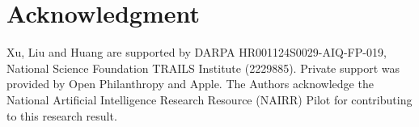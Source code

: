 \section{Acknowledgment}

Xu, Liu and Huang are supported by DARPA HR001124S0029-AIQ-FP-019, National Science Foundation TRAILS Institute (2229885). Private support was provided by Open Philanthropy and Apple. The Authors acknowledge the National Artificial Intelligence Research Resource (NAIRR) Pilot for contributing to this research result.
